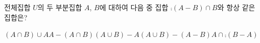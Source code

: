 전체집합 $U$의 두 부분집합 $A$, $B$에 대하여 다음 중 집합 $\comp{(A-B)}\cap B$와 항상 같은 집합은?
\begin{choicesii}{$(A\cap B)\cup A$}{$A-(A\cap B)$}{$(A\cup B)-A$}{$(A\cup B)-(A-B)$}{$A\cap\comp{(B-A)}$}\end{choicesii}
